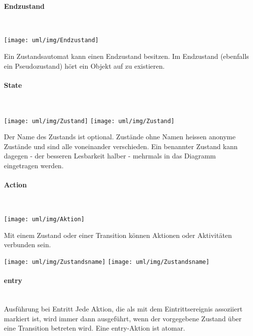 \begin{minipage}[c]{0.45\linewidth}
\paragraph{Endzustand}\ \\[2ex]
\begin{minipage}[c]{0.1\linewidth}
\texttt{[image: uml/img/Endzustand]}
\end{minipage}
\begin{minipage}[c]{0.89\linewidth}
Ein Zustandsautomat kann einen Endzustand besitzen.
Im Endzustand (ebenfalls ein Pseudozustand) h\"ort ein Objekt auf zu
existieren.
\end{minipage}
%
\newpage
\paragraph{State}\ \\[2ex]
\begin{minipage}[c]{0.28\linewidth}
\ifslides
\texttt{[image: uml/img/Zustand]}
\else
\texttt{[image: uml/img/Zustand]}
\fi
\end{minipage}
\begin{minipage}[c]{0.7\linewidth}
Der Name des Zustands ist optional. Zust\"ande ohne Namen
heissen anonyme Zust\"ande und sind alle voneinander verschieden.
Ein benannter Zustand kann dagegen - der besseren Lesbarkeit halber -
mehrmals in das Diagramm eingetragen werden.
\end{minipage}
%
\paragraph{Action}\ \\[2ex]
\begin{minipage}[c]{0.28\linewidth}
\texttt{[image: uml/img/Aktion]}
\end{minipage}\hfill
\begin{minipage}[c]{0.7\linewidth}
Mit einem Zustand oder einer Transition k\"onnen Aktionen oder
Aktivit\"aten verbunden sein. \\
\end{minipage}
%
\begin{minipage}[c]{0.28\linewidth}
\ifslides
\texttt{[image: uml/img/Zustandsname]}
\else
\texttt{[image: uml/img/Zustandsname]}
\fi
\end{minipage}
\begin{minipage}[c]{0.7\linewidth}
\paragraph{entry}\ \\[2ex]
\ifslides
Ausführung bei Entritt
\else
Jede Aktion, die als mit dem Eintrittsereignis assoziiert
markiert ist, wird immer dann ausgef\"uhrt, wenn der vorgegebene
Zustand \"uber eine Transition betreten wird. Eine entry-Aktion ist atomar.
\fi
%

\end{minipage}
\end{minipage}
